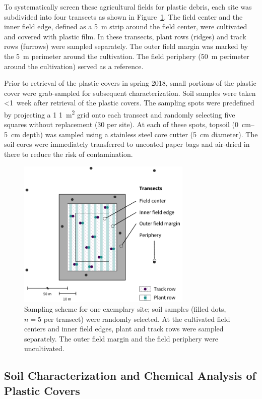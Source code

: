 To systematically screen these agricultural fields for plastic debris, each site was subdivided into four transects as shown in Figure~\ref{fig:transects}. The field center and the inner field edge, defined as a \SI{5}{\meter} strip around the field center, were cultivated and covered with plastic film. In these transects, plant rows (ridges) and track rows (furrows) were sampled separately. The outer field margin was marked by the \SI{5}{\meter} perimeter around the cultivation. The field periphery (\SI{50}{\meter} perimeter around the cultivation) served as a reference.

Prior to retrieval of the plastic covers in spring 2018, small portions of the plastic cover were grab-sampled for subsequent characterization.
Soil samples were taken \num{<1}~week after retrieval of the plastic covers. The sampling spots were predefined by projecting a \num{1}\,\texttimes\,\SI{1}{\square\meter} grid onto each transect and randomly selecting five squares without replacement (30 per site). At each of these spots, topsoil (\SIrange{0}{5}{\centi\meter} depth) was sampled using a stainless steel core cutter (\SI{5}{\centi\meter} diameter). The soil cores were immediately transferred to uncoated paper bags and air-dried in there to reduce the risk of contamination.

\begin{figure}
	\centering
	\includegraphics[width=3.267in]{figures/transects}
	\caption[Sampling scheme.]{Sampling scheme for one exemplary site; soil samples (filled dots, $n = 5$ per transect) were randomly selected. At the cultivated field centers and inner field edges, plant and track rows were sampled separately. The outer field margin and the field periphery were uncultivated.}
	\label{fig:transects}
\end{figure}

\subsection{Soil Characterization and Chemical Analysis of Plastic Covers}
\label{subsec:characterization}

